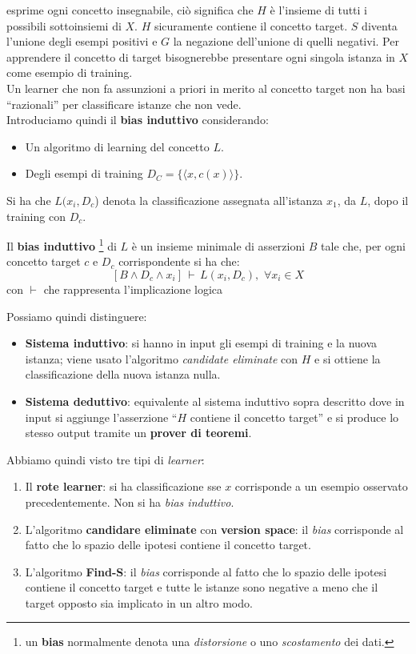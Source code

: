 esprime ogni concetto insegnabile, ciò significa che $H$ è l'insieme di tutti i
possibili sottoinsiemi di $X$. $H$ sicuramente contiene il concetto target. $S$
diventa l'unione degli esempi positivi e $G$ la negazione dell'unione di quelli
negativi. Per apprendere il concetto di target bisognerebbe presentare ogni
singola istanza in $X$ come esempio di training.\\
Un learner che non fa assunzioni a priori in merito al concetto target non ha
basi ``razionali'' per classificare istanze che non vede.\\
Introduciamo quindi il \textbf{bias induttivo} considerando:
\begin{itemize}
  \item Un algoritmo di learning del concetto $L$.
  \item Degli esempi di training $D_C=\{\langle x, c(x)\rangle\}$.
\end{itemize}
Si ha che $L(x_i, D_c$) denota la classificazione assegnata all'istanza $x_1$, da
$L$, dopo il training con $D_c$.
\begin{definizione}
  Il \textbf{bias induttivo} \footnote{un \textbf{bias} normalmente denota una
  \emph{distorsione} o uno \emph{scostamento} dei dati.} di $L$ è un insieme
  minimale di asserzioni $B$ tale 
  che, per ogni concetto target $c$ e $D_c$ corrispondente si ha che:
  \[[B\land D_c\land x_i]\,\vdash\, L(x_i, D_c),\,\,\forall x_i\in X\]
  con $\vdash$ che rappresenta l'implicazione logica
\end{definizione}
Possiamo quindi distinguere:
\begin{itemize}
  \item \textbf{Sistema induttivo}: si hanno in input gli esempi di
  training e la nuova istanza; viene usato l'algoritmo \textit{candidate
    eliminate} con $H$ e si ottiene la classificazione della nuova istanza
  nulla.
  \item \textbf{Sistema deduttivo}: equivalente al sistema induttivo sopra
  descritto dove in input si aggiunge l'asserzione ``$H$ contiene il concetto
  target'' e si produce lo stesso output tramite un \textbf{prover di teoremi}.
\end{itemize}
Abbiamo quindi visto tre tipi di \textit{learner}:
\begin{enumerate}
  \item Il \textbf{rote learner}: si ha classificazione sse $x$ corrisponde
  a un esempio osservato precedentemente. Non si ha \textit{bias induttivo}.
  \item L'algoritmo \textbf{candidare eliminate} con \textbf{version space}:
  il \textit{bias} corrisponde al fatto che lo spazio delle ipotesi contiene il concetto target. 
  \item L'algoritmo \textbf{Find-S}: il \textit{bias} corrisponde al fatto
  che lo spazio delle ipotesi contiene il concetto target e tutte le istanze
  sono negative a meno che il target opposto sia implicato in un altro modo. 
\end{enumerate}
\newpage
